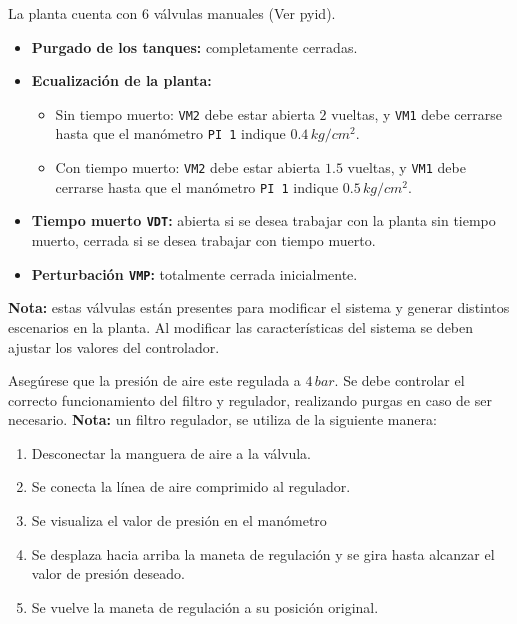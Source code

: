\begin{tcolorbox}[title=Válvulas manuales, breakable]

La planta cuenta con 6 válvulas manuales (Ver \gls{pyid}).

 \begin{itemize}
  \item \textbf{Purgado de los tanques:} completamente cerradas.
  \item \textbf{Ecualización de la planta:}
  \begin{itemize}
   \item Sin tiempo muerto: \verb|VM2| debe estar abierta $2$ vueltas, y
   \verb|VM1| debe cerrarse hasta que el manómetro \verb|PI 1| indique
   $0.4\,kg/cm^2$.
   \item Con tiempo muerto: \verb|VM2| debe estar abierta $1.5$ vueltas, y
   \verb|VM1| debe cerrarse hasta que el manómetro \verb|PI 1| indique
   $0.5\,kg/cm^2$.
  \end{itemize}
  \item \textbf{Tiempo muerto \texttt{VDT}:} abierta si se desea trabajar con
la planta sin tiempo muerto, cerrada si se desea trabajar con tiempo muerto.
  \item \textbf{Perturbación \texttt{VMP}:} totalmente cerrada inicialmente.
 \end{itemize}
 \tcblower
 \textbf{Nota:} estas válvulas están presentes para modificar el sistema y
generar distintos
escenarios en la planta. Al modificar las características del sistema se deben
ajustar los valores del controlador.
\end {tcolorbox}

\begin{tcolorbox}[title=Presión de aire]
  Asegúrese que la presión de aire este regulada a $4\,bar$. Se debe controlar
  el correcto funcionamiento del filtro y regulador, realizando purgas en caso
de ser necesario.
 \tcblower
  \textbf{Nota:} un filtro regulador, se utiliza de la siguiente manera:
 \begin{enumerate}
    \item Desconectar la manguera de aire a la válvula.
    \item Se conecta la línea de aire comprimido al regulador.
    \item Se visualiza el valor de presión en el manómetro
    \item Se desplaza hacia arriba la maneta de regulación y se gira hasta
      alcanzar el valor de presión deseado.
    \item Se vuelve la maneta de regulación a su posición original.
 \end{enumerate}
\end {tcolorbox}

